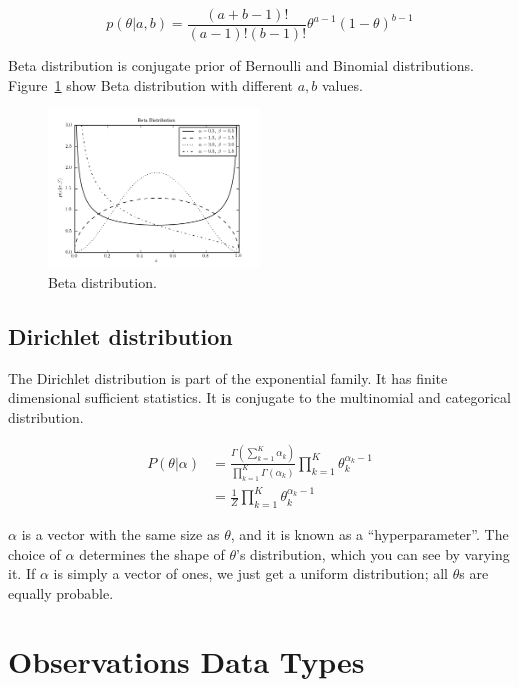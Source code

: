 \begin{equation}
	p(\theta | a,b) = \frac{ (a + b - 1)! }{ (a -1 )! (b - 1)!}\theta^{a -1}  (1 - \theta)^{b - 1}
\end{equation}

Beta distribution is conjugate prior of Bernoulli and Binomial distributions. Figure~\ref{fig:beta} show Beta distribution with different $a,b$ values.

\begin{figure}[htp]
\centering
\includegraphics[width=0.5\textwidth]{images/fig_beta_distribution_1.png}
\caption{Beta distribution. \cite{astroMLText}}
\label{fig:beta}
\end{figure}



\subsection*{Dirichlet distribution}
The Dirichlet distribution is part of the exponential family. It has finite dimensional sufficient statistics. It is conjugate to the multinomial and categorical distribution. 


\begin{align*}
    P (\theta | \alpha) &= \frac{\Gamma (\sum_{k=1}^K \alpha_k)}{\prod_{k=1}^K \Gamma (\alpha_k)}\prod_{k=1}^K \theta_k^{\alpha_k-1} \\
			  &= \frac{1}{Z} \prod_{k=1}^K \theta_k^{\alpha_k-1}
\end{align*}

$\alpha$ is a vector with the same size as $\theta$, and it is known as a ``hyperparameter''.  The choice of $\alpha$ determines the shape of $\theta$'s distribution, which you can see by varying it.  If $\alpha$ is simply a vector of ones, we just get a uniform distribution; all $\theta$s are equally probable.


\section{Observations Data Types}

